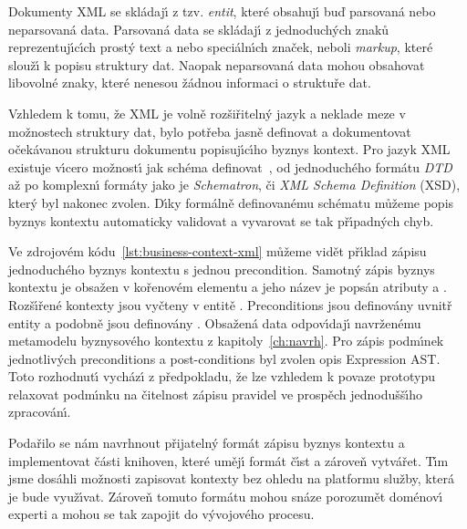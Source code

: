 Dokumenty \gls{XML} se skládaj\'{\i} z tzv. \textit{entit}, které obsahuj\'{\i}
buď parsovaná nebo neparsovaná data. Parsovaná data se skládaj\'{\i}
z jednoduch\'ych znaků reprezentuj\'{\i}c\'{\i}ch prost\'y text a nebo
speciáln\'{\i}ch značek, neboli \textit{markup}, které slouž\'{\i} k popisu
struktury dat. Naopak neparsovaná data mohou obsahovat libovolné
znaky, které nenesou žádnou informaci o struktuře dat.

Vzhledem k tomu, že \gls{XML} je volně rozšiřiteln\'y jazyk a neklade
meze v možnostech struktury dat, bylo potřeba jasně definovat
a dokumentovat očekávanou strukturu dokumentu popisuj\'{\i}c\'{\i}ho
byznys kontext. Pro jazyk \gls{XML} existuje v\'{\i}cero možnost\'{\i} jak schéma
definovat~\cite{lee2000comparative}, od jednoduchého formátu
\textit{DTD} až po komplexn\'{\i} formáty jako je \textit{Schematron}, či
\textit{XML Schema Definition} (\gls{XSD}), kter\'y byl nakonec zvolen.
D\'{\i}ky formálně definovanému schématu můžeme popis byznys kontextu
automaticky validovat a vyvarovat se tak př\'{\i}padn\'ych chyb.

Ve zdrojovém kódu~\ref{lst:business-context-xml} můžeme vidět
př\'{\i}klad zápisu jednoduchého byznys kontextu s jednou precondition.
Samotn\'y zápis byznys kontextu je obsažen v kořenovém elementu
 a jeho název je popsán atributy
 a . Rozš\'{\i}řené kontexty jsou vyčteny
v entitě . Preconditions jsou
definovány uvnitř entity  a podobně
jsou definovány . Obsažená data odpov\'{\i}daj\'{\i}
navrženému metamodelu byznysového kontextu z kapitoly~\ref{ch:navrh}.
Pro zápis podm\'{\i}nek jednotliv\'ych preconditions a post-conditions byl zvolen
opis Expression \gls{AST}. Toto rozhodnut\'{\i} vycház\'{\i} z předpokladu,
že lze vzhledem k povaze prototypu relaxovat podm\'{\i}nku
na čitelnost zápisu pravidel ve prospěch jednodušš\'{\i}ho zpracován\'{\i}.

Podařilo se nám navrhnout přijateln\'y formát zápisu byznys kontextu
a implementovat části knihoven, které uměj\'{\i} formát č\'{\i}st a zároveň vytvářet.
T\'{\i}m jsme dosáhli možnosti zapisovat kontexty bez ohledu na platformu
služby, která je bude využ\'{\i}vat. Zároveň tomuto formátu mohou
snáze porozumět doménov\'{\i} experti a mohou se tak zapojit do
v\'yvojového procesu.

